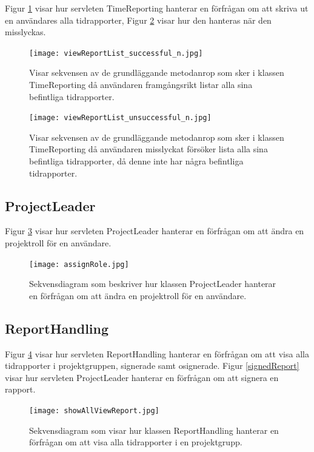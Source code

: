 \documentclass[a4paper]{article}
\begin{document}
\noindent
Figur \ref{viewReportList} visar hur servleten TimeReporting hanterar en förfrågan om att skriva ut en användares alla tidrapporter, Figur \ref{viewReportListFail} visar hur den hanteras när den misslyckas.

\begin{figure}[h!]
\centering
\texttt{[image: viewReportList\_successful\_n.jpg]}
\caption{Visar sekvensen av de grundläggande metodanrop som sker i klassen TimeReporting då användaren framgångsrikt listar alla sina befintliga tidrapporter.
\label{viewReportList}}
\end{figure}

\begin{figure}[h!]
\centering
\texttt{[image: viewReportList\_unsuccessful\_n.jpg]}
\caption{Visar sekvensen av de grundläggande metodanrop som sker i klassen TimeReporting då användaren misslyckat försöker lista alla sina befintliga tidrapporter, då denne inte har några befintliga tidrapporter.
\label{viewReportListFail}}
\end{figure}


\subsection{ProjectLeader}
Figur \ref{assignRole} visar hur servleten ProjectLeader hanterar en förfrågan om att ändra en projektroll för en användare.

\begin{figure}[h!]
\centering
\texttt{[image: assignRole.jpg]}
\caption{Sekvensdiagram som beskriver hur klassen ProjectLeader hanterar en förfrågan om att ändra en projektroll för en användare.
\label{assignRole}}
\end{figure}

\subsection{ReportHandling}

Figur \ref{showAllViewReport} visar hur servleten ReportHandling hanterar en förfrågan om att visa alla tidrapporter i projektgruppen, signerade samt osignerade. Figur \ref{signedReport} visar hur servleten ProjectLeader hanterar en förfrågan om att signera en rapport.

\begin{figure}[h!]
\centering
\texttt{[image: showAllViewReport.jpg]}
\caption{Sekvensdiagram som visar hur klassen ReportHandling hanterar en förfrågan om att visa alla tidrapporter i en projektgrupp.
\label{showAllViewReport}}
\end{figure}
\end{document}
